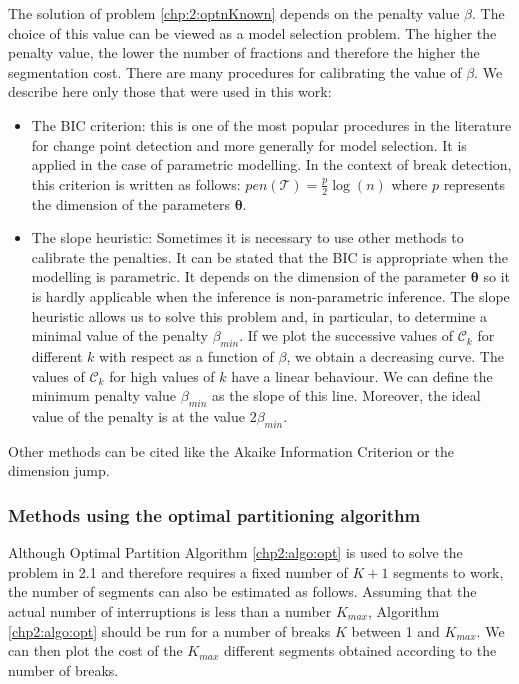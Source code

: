 The solution of problem \ref{chp:2:optnKnown} depends on the penalty value $\beta$. The choice of this value can be viewed as a model selection problem. The higher the penalty value, the lower the number of fractions and therefore the higher the segmentation cost. There are many procedures for calibrating the value of $\beta$. We describe here only those that were used in this work: 

\begin{itemize}
  \item The BIC criterion: this is one of the most popular procedures in the literature for change point detection and more generally for model selection. It is applied in the case of parametric modelling. In the context of break detection, this criterion is written as follows: $pen(\mathcal{T}) = \frac{p}{2}\log(n)$ where $p$ represents the dimension of the parameters $\bm \theta$.
  \item The slope heuristic: Sometimes it is necessary to use other methods to calibrate the penalties. It can be stated that the BIC is appropriate when the modelling is parametric. It depends on the dimension of the parameter $\bm \theta$ so it is hardly applicable when the inference is non-parametric inference. The slope heuristic allows us to solve this problem and, in particular, to determine a minimal value of the penalty $\beta_{min}$. If we plot the successive values of $\mathcal{C}_k$ for different $k$ with respect as a function of $\beta$, we obtain a decreasing curve. The values of $\mathcal{C}_k$ for high values of $k$ have a linear behaviour. We can define the minimum penalty value $\beta_{min}$ as the slope of this line. Moreover, the ideal value of the penalty is at the value $2\beta_{min}$. 
\end{itemize}

Other methods can be cited like the Akaike Information Criterion or the dimension jump.  

\subsubsection{Methods using the optimal partitioning algorithm}

Although Optimal Partition Algorithm \ref{chp2:algo:opt} is used to solve the problem in 2.1 and therefore requires a fixed number of $K+1$ segments to work, the number of segments can also be estimated as follows. Assuming that the actual number of interruptions is less than a number $K_{max}$, Algorithm \ref{chp2:algo:opt} should be run for a number of breaks $K$ between 1 and $K_{max}$. We can then plot the cost of the $K_{max}$ different segments obtained according to the number of breaks. 

